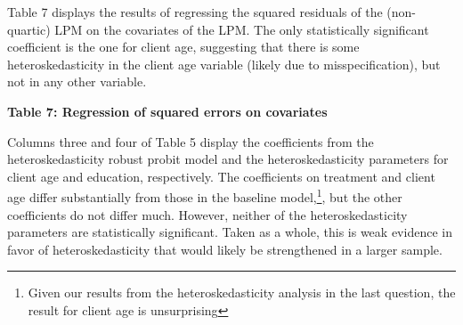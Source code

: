 \documentclass{article}
\begin{document}
Table 7 displays the results of regressing the squared residuals of the (non-quartic) LPM on the covariates of the LPM. The only statistically significant coefficient is the one for client age, suggesting that there is some heteroskedasticity in the client age variable (likely due to misspecification), but not in any other variable.
\pagebreak
\begin{center}
        \textbf{Table 7: Regression of squared errors on covariates} \\\medskip
        
\end{center}
Columns three and four of Table 5 display the coefficients from the heteroskedasticity robust probit model and the heteroskedasticity parameters for client age and education, respectively. The coefficients on treatment and client age differ substantially from those in the baseline model,\footnote{Given our results from the heteroskedasticity analysis in the last question, the result for client age is unsurprising}, but the other coefficients do not differ much. However, neither of the heteroskedasticity parameters are statistically significant. Taken as a whole, this is weak evidence in favor of heteroskedasticity that would likely be strengthened in a larger sample.
\end{document}
